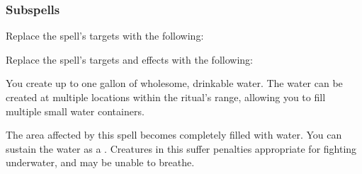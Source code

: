 \subsubsection{Subspells}
Replace the spell's targets with the following:
\begin{spellcontent}
\begin{augmenttargetinginfo}
\end{augmenttargetinginfo}
\end{spellcontent}
Replace the spell's targets and effects with the following:
\begin{spellcontent}
\begin{augmenttargetinginfo}
\spellrng{\rngclose}
\end{augmenttargetinginfo}
\begin{augmenteffects}
\spelleffect
You create up to one gallon of wholesome, drinkable water.
The water can be created at multiple locations within the ritual's range, allowing you to fill multiple small water containers.
\end{augmenteffects}
\end{spellcontent}
The area affected by this spell becomes completely filled with water.
You can sustain the water as a .
Creatures in this  suffer penalties appropriate for fighting underwater, and may be unable to breathe.
